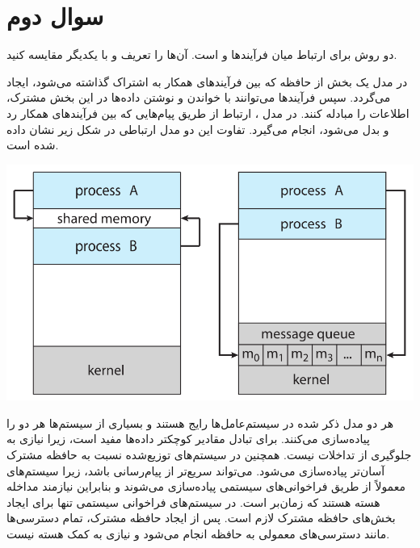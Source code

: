\section{سوال دوم}

دو روش برای ارتباط میان فرآیندها  و  است. آن‌ها را تعریف و با یکدیگر مقایسه کنید.

\begin{qsolve}
	در مدل  یک بخش از حافظه که بین فرآیندهای همکار به اشتراک گذاشته می‌شود، ایجاد می‌گردد. سپس فرآیندها می‌توانند با خواندن و نوشتن داده‌ها در این بخش مشترک، اطلاعات را مبادله کنند. در مدل ، ارتباط از طریق پیام‌هایی که بین فرآیندهای همکار رد و بدل می‌شود، انجام می‌گیرد. تفاوت این دو مدل ارتباطی در شکل زیر نشان داده شده است.
	
	\begin{center}
		\includegraphics*[width=0.7\linewidth]{pics/img4.png}
	\end{center}
	
	هر دو مدل ذکر شده در سیستم‌عامل‌ها رایج هستند و بسیاری از سیستم‌ها هر دو را پیاده‌سازی می‌کنند.  برای تبادل مقادیر کوچکتر داده‌ها مفید است، زیرا نیازی به جلوگیری از تداخلات نیست.  همچنین در سیستم‌های توزیع‌شده نسبت به حافظه مشترک آسان‌تر پیاده‌سازی می‌شود.  می‌تواند سریع‌تر از پیام‌رسانی باشد، زیرا سیستم‌های  معمولاً از طریق فراخوانی‌های سیستمی پیاده‌سازی می‌شوند و بنابراین نیازمند مداخله هسته هستند که زمان‌بر است. در سیستم‌های  فراخوانی سیستمی تنها برای ایجاد بخش‌های حافظه مشترک لازم است. پس از ایجاد حافظه مشترک، تمام دسترسی‌ها مانند دسترسی‌های معمولی به حافظه انجام می‌شود و نیازی به کمک هسته نیست.
\end{qsolve}